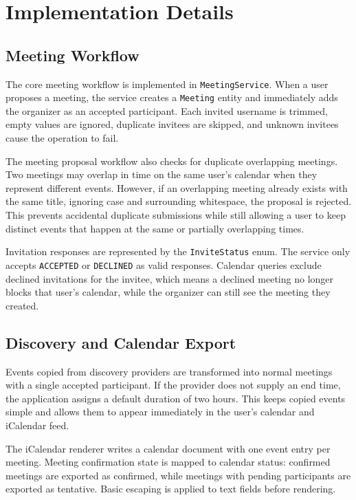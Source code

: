 \chapter{Implementation Details} \label{cap:impl}

\section{Meeting Workflow}

The core meeting workflow is implemented in \texttt{MeetingService}. When a user proposes a meeting, the service creates a \texttt{Meeting} entity and immediately adds the organizer as an accepted participant. Each invited username is trimmed, empty values are ignored, duplicate invitees are skipped, and unknown invitees cause the operation to fail.

The meeting proposal workflow also checks for duplicate overlapping meetings. Two meetings may overlap in time on the same user's calendar when they represent different events. However, if an overlapping meeting already exists with the same title, ignoring case and surrounding whitespace, the proposal is rejected. This prevents accidental duplicate submissions while still allowing a user to keep distinct events that happen at the same or partially overlapping times.

Invitation responses are represented by the \texttt{InviteStatus} enum. The service only accepts \texttt{ACCEPTED} or \texttt{DECLINED} as valid responses. Calendar queries exclude declined invitations for the invitee, which means a declined meeting no longer blocks that user's calendar, while the organizer can still see the meeting they created.

\section{Discovery and Calendar Export}

Events copied from discovery providers are transformed into normal meetings with a single accepted participant. If the provider does not supply an end time, the application assigns a default duration of two hours. This keeps copied events simple and allows them to appear immediately in the user's calendar and iCalendar feed.

The iCalendar renderer writes a calendar document with one event entry per meeting. Meeting confirmation state is mapped to calendar status: confirmed meetings are exported as confirmed, while meetings with pending participants are exported as tentative. Basic escaping is applied to text fields before rendering.

